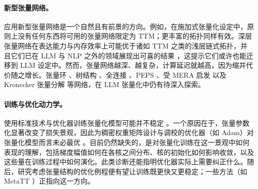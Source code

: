 

\paragraph{新型张量网络。}

应用新型张量网络是一个自然且有前景的方向。例如，在施加式张量化设定中，原则上没有任何东西将可用的张量网络限定为 TTM；更丰富的拓扑同样有效。深层张量网络在表达能力与内存效率上可能优于诸如 TTM 之类的浅层链式拓扑，并且它们已在 LLM 与 NLP 之外的领域展现出可喜的结果 \cite{adtn}，这提示它们或许也能迁移到 LLM 设定中。然而，张量网络越深、越复杂，计算延迟就越高，因为缩并代价随之增长。张量环 \cite{zhao2016tensorring}、树结构 \cite{gracedyck2010h_tucker}、全连接 \cite{zheng2021fctn}、PEPS \cite{verstraete2008peps}、受 MERA 启发 \cite{vidal2008mera} 以及 Kronecker 张量分解 \cite{batselier2017ktd} 等网络，在 LLM 张量化中仍有待深入探索。


\paragraph{训练与优化动力学。} 

使用标准技术与优化器训练张量化模型可能并不稳定 \cite{barratt2022tnunstabletraining}。一个原因在于，张量参数化显著改变了损失景观，因此为稠密权重矩阵设计与调校的优化器（如 Adam）对张量化模型而言未必最优 \cite{yang2024comera}。目前仍然缺失的，是对张量化训练在这一景观中如何表现的理解，包括梯度幅值如何在各核之间分布、核的初始化如何影响收敛，以及这些量在训练过程中如何演化。此类诊断还能指明优化器实际上需要纠正什么。随后，研究考虑张量结构的优化例程便有望让训练既更快又更稳定；一些方法（如 MetaTT \cite{lopezpiqueres2025metatt}）正指向这一方向。

